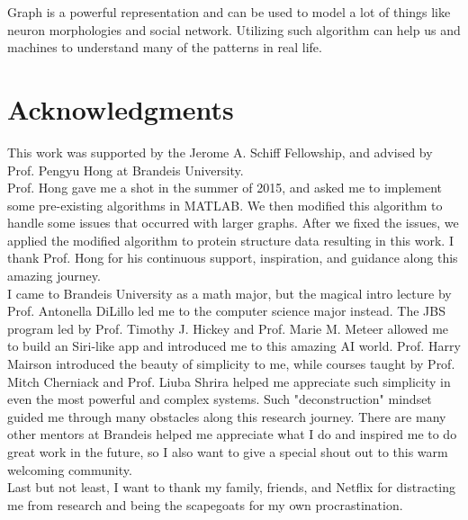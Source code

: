 Graph is a powerful representation and can be used to model a lot of things like neuron morphologies and social network. Utilizing such algorithm can help us and machines to understand many of the patterns in real life.

\chapter*{Acknowledgments}

This work was supported by the Jerome A. Schiff Fellowship, and advised by Prof. Pengyu Hong at Brandeis University.\\

Prof. Hong gave me a shot in the summer of 2015, and asked me to implement some pre-existing algorithms in MATLAB. We then modified this algorithm to handle some issues that occurred with larger graphs. After we fixed the issues, we applied the modified algorithm to protein structure data resulting in this work. I thank Prof. Hong for his continuous support, inspiration, and guidance along this amazing journey.\\

I came to Brandeis University as a math major, but the magical intro lecture by Prof. Antonella DiLillo led me to the computer science major instead. The JBS program led by Prof. Timothy J. Hickey and Prof. Marie M. Meteer allowed me to build an Siri-like app and introduced me to this amazing AI world. Prof. Harry Mairson introduced the beauty of simplicity to me, while courses taught by Prof. Mitch Cherniack and Prof. Liuba Shrira helped me appreciate such simplicity in even the most powerful and complex systems. Such "deconstruction" mindset guided me through many obstacles along this research journey. There are many other mentors at Brandeis helped me appreciate what I do and inspired me to do great work in the future, so I also want to give a special shout out to this warm welcoming community.\\

Last but not least, I want to thank my family, friends, and Netflix for distracting me from research and being the scapegoats for my own procrastination.